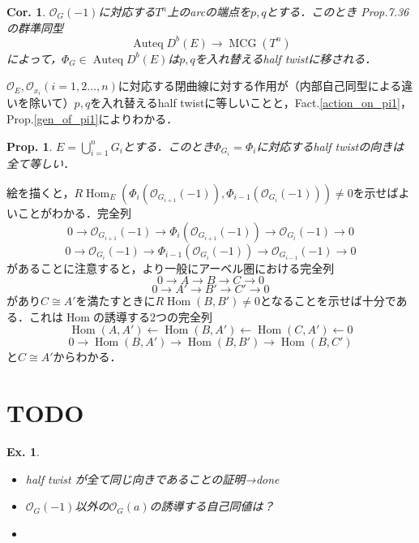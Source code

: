 \documentclass[uplatex,a4paper,11pt,dvipdfmx]{jsarticle}
\makeatletter
\theoremstyle{mystyle} %
\newtheorem{proposition}[theorem]{Prop.}
\newtheorem{corollary}[theorem]{Cor.}
\newtheorem{example}[theorem]{Ex.}
\renewenvironment{proof}[1][\proofname]{\par
 \pushQED{\qed}%
 \normalfont \topsep6\p@\@plus6\p@\relax
 \trivlist
 \item[\hskip\labelsep
 \itshape
 {\bf\underline{#1}}]\ignorespaces
}{%
 \popQED\endtrivlist\@endpefalse
}
\DeclareMathOperator{\Auteq}{Auteq}\DeclareMathOperator{\Coh}{Coh}
\DeclareMathOperator{\Hom}{Hom}
\DeclareMathOperator{\MCG}{MCG}
\makeatother
\begin{document}
\begin{corollary}
	$\mathcal{O}_G(-1)$に対応する$T^n$上のarcの端点を$p, q$とする．このとき\cite{Opp20} Prop.7.36 の群準同型$$\Auteq D^b(E) \to \MCG(T^n)$$によって，$\Phi_G \in \Auteq D^b(E)$は$p, q$を入れ替えるhalf twistに移される．
\end{corollary}
\begin{proof}
	$\mathcal{O}_E, \mathcal{O}_{x_i}(i=1,2 \dots, n)$に対応する閉曲線に対する作用が（内部自己同型による違いを除いて）$p, q$を入れ替えるhalf twistに等しいことと，Fact.\ref{action_on_pi1}，Prop.\ref{gen_of_pi1}によりわかる．
\end{proof}
\begin{proposition}
	$E = \bigcup_{i=1}^n G_i$とする．このとき$\Phi_{G_i} = \Phi_i$に対応するhalf twistの向きは全て等しい．
\end{proposition}
\begin{proof}
	絵を描くと，$R\Hom_E(\Phi_{i}(\mathcal{O}_{G_{i+1}}(-1)), \Phi_{i-1}(\mathcal{O}_{G_i}(-1))) \neq 0$を示せばよいことがわかる．完全列$$0 \to \mathcal{O}_{G_{i+1}}(-1) \to \Phi_i(\mathcal{O}_{G_{i+1}}(-1)) \to \mathcal{O}_{G_i}
		(-1) \to 0$$
	$$0 \to \mathcal{O}_{G_{i}}(-1) \to \Phi_{i-1}(\mathcal{O}_{G_{i}}(-1)) \to \mathcal{O}_{G_{i-1}}
		(-1) \to 0$$があることに注意すると，より一般にアーベル圏における完全列$$0 \to A \to B \to C
		\to 0$$$$0 \to A' \to B' \to C' \to 0$$があり$C \cong A'$を満たすときに$R\Hom(B, B') \neq 0$となることを示せば十分である．これは$\Hom$の誘導する2つの完全列$$\Hom (A, A') \leftarrow \Hom(B, A') \leftarrow \Hom(C, A') \leftarrow 0$$$$0 \to \Hom(B, A') \to \Hom(B, B') \to \Hom(B, C') $$と$C \cong A'$からわかる．
\end{proof}

\section{TODO}
\begin{example}
	\begin{itemize}
		\item half twist が全て同じ向きであることの証明→done
		\item $\mathcal{O}_G(-1)$以外の$\mathcal{O}_G(a)$の誘導する自己同値は？
	\end{itemize}
\end{example}
\begin{itemize}
	\item
\end{itemize}
\end{document}
